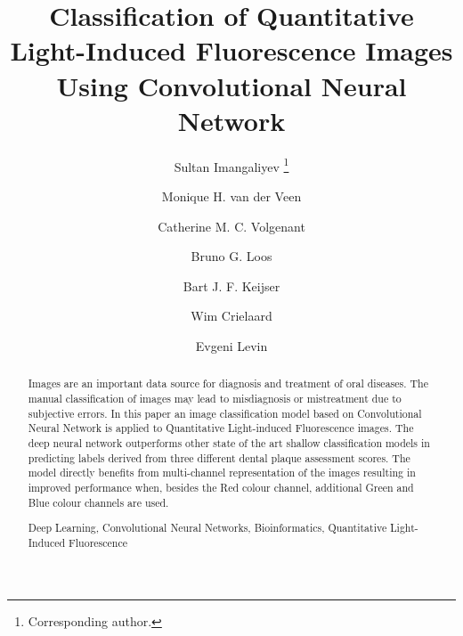 \documentclass[runningheads,a4paper]{llncs}
\newcommand{\keywords}[1]{\par\addvspace\baselineskip
\noindent\keywordname\enspace\ignorespaces#1}
\begin{document}
\mainmatter  %

\title{Classification of Quantitative Light-Induced Fluorescence Images Using Convolutional Neural Network}


%
%
\author{Sultan Imangaliyev
\thanks{Corresponding author.}\and
Monique H. van der Veen \and Catherine M. C. Volgenant \and Bruno G. Loos \and Bart J. F. Keijser \and Wim Crielaard \and Evgeni Levin}

%
%
%

\maketitle


\begin{abstract}
Images are an important data source for diagnosis and treatment of oral diseases. The manual classification of images may lead to misdiagnosis or mistreatment due to subjective errors. In this paper an image classification model based on Convolutional Neural Network is applied to Quantitative Light-induced Fluorescence images. The deep neural network outperforms other state of the art shallow classification models in predicting labels derived from three different dental plaque assessment scores. The model directly benefits from multi-channel representation of the images resulting in improved performance when, besides the Red colour channel, additional Green and Blue colour channels are used.
\keywords{Deep Learning, Convolutional Neural Networks, Bioinformatics, Quantitative Light-Induced Fluorescence}
\end{abstract}
\end{document}
